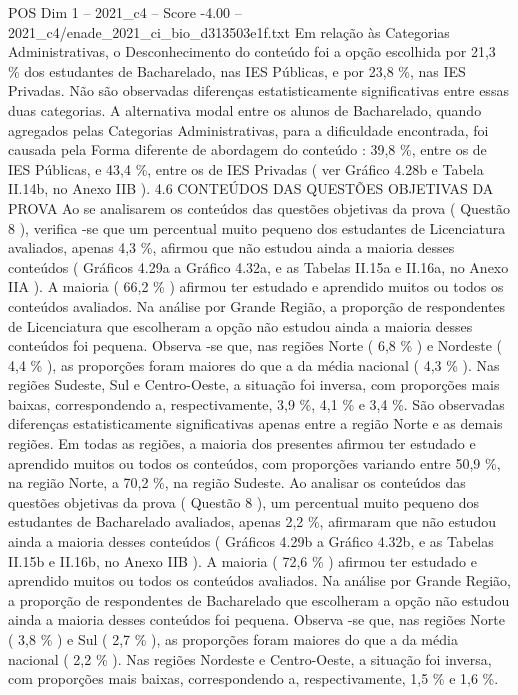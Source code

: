 \begin{textsample}{POS Dim 1 – 2021\_c4 – Score -4.00 – 2021\_c4/enade\_2021\_ci\_bio\_d313503e1f.txt}
Em relação às Categorias Administrativas, o Desconhecimento do conteúdo foi a opção escolhida por 21,3 \% dos estudantes de Bacharelado, nas IES Públicas, e por 23,8 \%, nas IES Privadas.
Não são observadas diferenças estatisticamente significativas entre essas duas categorias.
A alternativa modal entre os alunos de Bacharelado, quando agregados pelas Categorias Administrativas, para a dificuldade encontrada, foi causada pela Forma diferente de abordagem do conteúdo : 39,8 \%, entre os de IES Públicas, e 43,4 \%, entre os de IES Privadas ( ver Gráfico 4.28b e Tabela II.14b, no Anexo IIB ). 4.6 CONTEÚDOS DAS QUESTÕES OBJETIVAS DA PROVA Ao se analisarem os conteúdos das questões objetivas da prova ( Questão 8 ), verifica -se que um percentual muito pequeno dos estudantes de Licenciatura avaliados, apenas 4,3 \%, afirmou que não estudou ainda a maioria desses conteúdos ( Gráficos 4.29a a Gráfico 4.32a, e as Tabelas II.15a e II.16a, no Anexo IIA ).
A maioria ( 66,2 \% ) afirmou ter estudado e aprendido muitos ou todos os conteúdos avaliados.
Na análise por Grande Região, a proporção de respondentes de Licenciatura que escolheram a opção não estudou ainda a maioria desses conteúdos foi pequena.
Observa -se que, nas regiões Norte ( 6,8 \% ) e Nordeste ( 4,4 \% ), as proporções foram maiores do que a da média nacional ( 4,3 \% ).
Nas regiões Sudeste, Sul e Centro-Oeste, a situação foi inversa, com proporções mais baixas, correspondendo a, respectivamente, 3,9 \%, 4,1 \% e 3,4 \%.
São observadas diferenças estatisticamente significativas apenas entre a região Norte e as demais regiões.
Em todas as regiões, a maioria dos presentes afirmou ter estudado e aprendido muitos ou todos os conteúdos, com proporções variando entre 50,9 \%, na região Norte, a 70,2 \%, na região Sudeste.
Ao analisar os conteúdos das questões objetivas da prova ( Questão 8 ), um percentual muito pequeno dos estudantes de Bacharelado avaliados, apenas 2,2 \%, afirmaram que não estudou ainda a maioria desses conteúdos ( Gráficos 4.29b a Gráfico 4.32b, e as Tabelas II.15b e II.16b, no Anexo IIB ).
A maioria ( 72,6 \% ) afirmou ter estudado e aprendido muitos ou todos os conteúdos avaliados.
Na análise por Grande Região, a proporção de respondentes de Bacharelado que escolheram a opção não estudou ainda a maioria desses conteúdos foi pequena.
Observa -se que, nas regiões Norte ( 3,8 \% ) e Sul ( 2,7 \% ), as proporções foram maiores do que a da média nacional ( 2,2 \% ).
Nas regiões Nordeste e Centro-Oeste, a situação foi inversa, com proporções mais baixas, correspondendo a, respectivamente, 1,5 \% e 1,6 \%.

\end{textsample}
